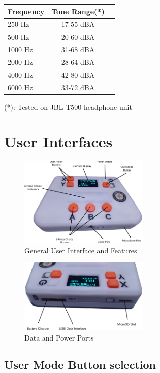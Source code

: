 \documentclass[a4paper,12pt,oneside,pdflatex,italian,final,twocolumn]{article}
\begin{document}
\centering
\begin{tabular}{lcr}
\toprule
  Frequency & Tone Range(*) \\
\midrule
250 Hz & 17-55 dBA \\
500 Hz & 20-60 dBA \\
1000 Hz & 31-68 dBA \\
2000 Hz & 28-64 dBA \\
4000 Hz & 42-80 dBA \\
6000 Hz & 33-72 dBA \\
\bottomrule
\end{tabular}

\vspace{5pt}
\footnotesize{(*): Tested on JBL T500 headphone unit}



\raggedright
\section{User Interfaces}
\centering
\begin{figure} [h]
\centering
\includegraphics[width=0.55\textwidth,]{images/useriface.png}
\caption{General User Interface and Features}
\end{figure}

\begin{figure} [h]
\centering
\includegraphics[width=0.55\textwidth,]{images/portuser.png}
\caption{Data and Power Ports}
\end{figure}

\raggedright
\subsection{User Mode Button selection}
\end{document}
